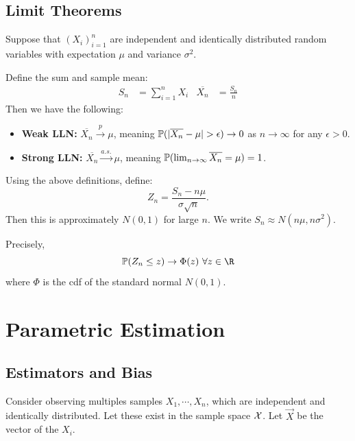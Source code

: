 \documentclass[../Main.tex]{subfiles}
\begin{document}
\subsection{Limit Theorems}
\begin{theorem}
    Suppose that $(X_i)_{i = 1}^n$ are independent and identically distributed random variables with expectation $\mu$ and variance $\sigma^2$.

    Define the sum and sample mean:
    \begin{align*}
        S_n &= \sum_{i=1}^{n} X_i & \overline{X_n} &= \frac{S_n}{n}
    \end{align*}
    Then we have the following:
    \begin{itemize}
        \item \textbf{Weak LLN:} $\overline{X_n} \xrightarrow{p} \mu$, meaning $\P(|\overline{X_n} - \mu| > \epsilon) \to 0$ as $n \to \infty$ for any $\epsilon > 0$.
        \item \textbf{Strong LLN:} $\overline{X_n} \xrightarrow{a.s.} \mu$, meaning $\P(\lim_{n \to \infty} \overline{X_n} = \mu) = 1$.
    \end{itemize}
    \label{thmLLN}
\end{theorem}
\begin{theorem}
    Using the above definitions, define:
    \begin{equation*}
        Z_n = \frac{S_n - n \mu}{\sigma \sqrt{n}}.
    \end{equation*}
    Then this is approximately $N(0, 1)$ for large $n$. We write $S_n \approx N(n \mu, n \sigma^2)$.

    Precisely,
    \begin{equation*}
        \P(Z_n \leq z) \to \Phi(z)~\forall z\in\R
    \end{equation*}
    where $\Phi$ is the cdf of the standard normal $N(0, 1)$.
    \label{thmCentralLim}
\end{theorem}
\section{Parametric Estimation}
\subsection{Estimators and Bias}
Consider observing multiples samples $X_1, \cdots, X_n$, which are independent and identically distributed. Let these exist in the sample space $\samplespace$. Let $\vec{X}$ be the vector of the $X_i$.
\end{document}
